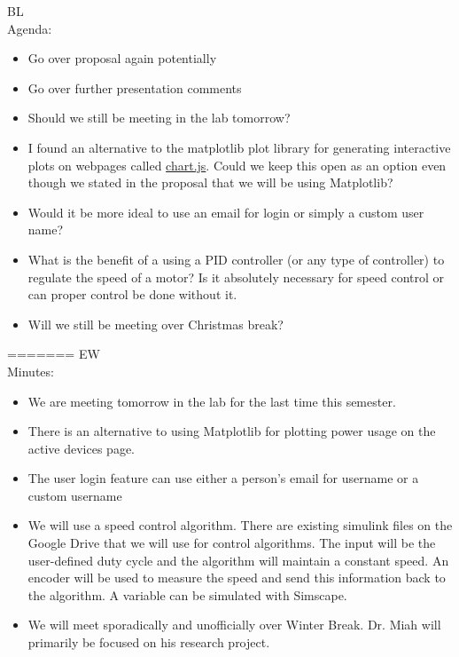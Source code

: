 \documentclass[fontsize=11pt, %
                             paper=letter, %
                             openany, %
                             captions=tableheading,
                             index=totoc,
                             hyperref]{labbook}
\begin{document}
BL\\
Agenda:
\begin{itemize}
\item Go over proposal again potentially
\item Go over further presentation comments
\item Should we still be meeting in the lab tomorrow?
\item I found an alternative to the matplotlib plot library for generating
interactive plots on webpages called \href{https://www.chartjs.org/}{chart.js}. Could we keep this open as an option even though we stated in the proposal that we will be using Matplotlib?
\item Would it be more ideal to use an email for login or simply a custom user name?
\item What is the benefit of a using a PID controller (or any type of controller) to regulate the speed of a motor? Is it absolutely necessary for speed control or can proper control be done without it. 
\item Will we still be meeting over Christmas break?
\end{itemize}
=======
EW\\
Minutes:
\begin{itemize}
\item We are meeting tomorrow in the lab for the last time this semester.
\item There is an alternative to using Matplotlib for plotting power usage on the active devices page. 
\item The user login feature can use either a person's email for username or a custom username
\item We will use a speed control algorithm. There are existing simulink files on the Google Drive that we will use for control algorithms. The input will be the user-defined duty cycle and the algorithm will maintain a constant speed. An encoder will be used to measure the speed and send this information back to the algorithm. A variable can be simulated with Simscape. 
\item We will meet sporadically and unofficially over Winter Break. Dr. Miah will primarily be focused on his research project. 
\end{itemize}
\end{document}
